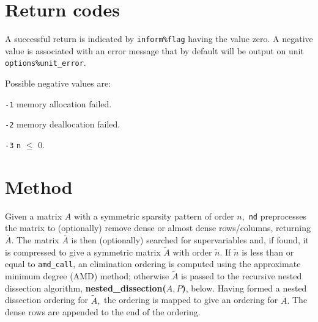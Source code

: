
\section{Return codes} \label{nd:errors}

A successful return is indicated by
{\tt inform\%flag} having the value zero.
A negative value is associated with an error message that by default will
be output on unit {\tt options\%unit\_error}.

Possible negative values are:

\begin{description}

\item{} {\tt -1} memory allocation failed.
\item{} {\tt -2} memory deallocation failed.
\item{} {\tt -3} {\tt n} $\le$ 0.
\end{description}


\section{Method} \label{method}

Given a matrix $A$ with a symmetric sparsity pattern of order $n,$ {\tt nd} preprocesses 
the matrix to (optionally) remove dense or almost dense rows/columns, returning 
$\overline{A}.$ The matrix $\overline{A}$ is then (optionally) searched for 
supervariables and, if found, it is compressed to give a symmetric matrix 
$\widetilde{A}$ with order $\tilde{n}.$ If $\tilde{n}$ is less than or equal to 
{\tt amd\_call}, an elimination ordering is computed using the 
approximate minimum degree (AMD) method; otherwise $\widetilde{A}$ is passed to the 
recursive nested dissection algorithm, \textbf{nested\_dissection($A,P$)}, below. Having formed a 
nested dissection ordering for $\widetilde{A},$ the 
ordering is mapped to give an ordering for $\overline{A}.$ The dense rows are 
appended to the end of the ordering. 


